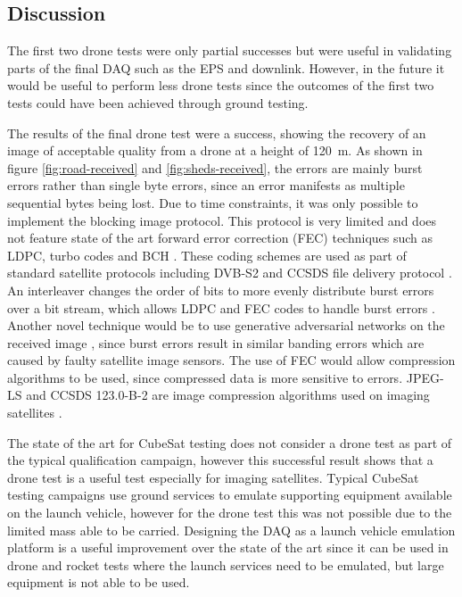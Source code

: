 \documentclass{report}
\begin{document}
\subsection{Discussion}

The first two drone tests were only partial successes but were useful in validating parts of the final DAQ such as the EPS and downlink. However, in the future it would be useful to perform less drone tests since the outcomes of the first two tests could have been achieved through ground testing.

The results of the final drone test were a success, showing the recovery of an image of acceptable quality from a drone at a height of \SI{120}{\metre}. As shown in figure \ref{fig:road-received} and \ref{fig:sheds-received}, the errors are mainly burst errors rather than single byte errors, since an error manifests as multiple sequential bytes being lost. Due to time constraints, it was only possible to implement the blocking image protocol. This protocol is very limited and does not feature state of the art forward error correction (FEC) techniques such as LDPC, turbo codes and BCH \cite{10224067}. These coding schemes are used as part of standard satellite protocols including DVB-S2 and CCSDS file delivery protocol \cite{10224067}. An interleaver changes the order of bits to more evenly distribute burst errors over a bit stream, which allows LDPC and FEC codes to handle burst errors \cite{sonali2021capacity}. Another novel technique would be to use generative adversarial networks on the received image \cite{10131946}, since burst errors result in similar banding errors which are caused by faulty satellite image sensors. The use of FEC would allow compression algorithms to be used, since compressed data is more sensitive to errors. JPEG-LS and CCSDS 123.0-B-2 are image compression algorithms used on imaging satellites \cite{9352211}.

The state of the art for CubeSat testing does not consider a drone test as part of the typical qualification campaign, however this successful result shows that a drone test is a useful test especially for imaging satellites. Typical CubeSat testing campaigns use ground services to emulate supporting equipment available on the launch vehicle, however for the drone test this was not possible due to the limited mass able to be carried. Designing the DAQ as a launch vehicle emulation platform is a useful improvement over the state of the art since it can be used in drone and rocket tests where the launch services need to be emulated, but large equipment is not able to be used.
\end{document}

